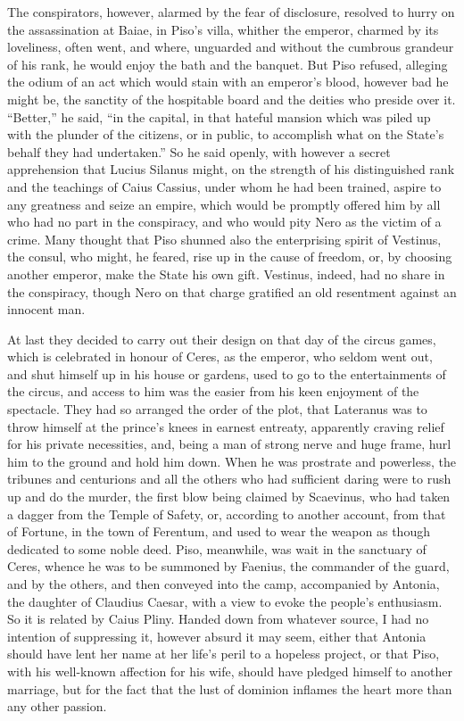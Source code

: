 The conspirators, however, alarmed by the fear of disclosure, resolved to hurry on the assassination at Baiae, in Piso's villa, whither the emperor, charmed by its loveliness, often went, and where, unguarded and without the cumbrous grandeur of his rank, he would enjoy the bath and the banquet. But Piso refused, alleging the odium of an act which would stain with an emperor's blood, however bad he might be, the sanctity of the hospitable board and the deities who preside over it. ``Better,'' he said, ``in the capital, in that hateful mansion which was piled up with the plunder of the citizens, or in public, to accomplish what on the State's behalf they had undertaken.'' So he said openly, with however a secret apprehension that Lucius Silanus might, on the strength of his distinguished rank and the teachings of Caius Cassius, under whom he had been trained, aspire to any greatness and seize an empire, which would be promptly offered him by all who had no part in the conspiracy, and who would pity Nero as the victim of a crime. Many thought that Piso shunned also the enterprising spirit of Vestinus, the consul, who might, he feared, rise up in the cause of freedom, or, by choosing another emperor, make the State his own gift. Vestinus, indeed, had no share in the conspiracy, though Nero on that charge gratified an old resentment against an innocent man.


At last they decided to carry out their design on that day of the circus games, which is celebrated in honour of Ceres, as the emperor, who seldom went out, and shut himself up in his house or gardens, used to go to the entertainments of the circus, and access to him was the easier from his keen enjoyment of the spectacle. They had so arranged the order of the plot, that Lateranus was to throw himself at the prince's knees in earnest entreaty, apparently craving relief for his private necessities, and, being a man of strong nerve and huge frame, hurl him to the ground and hold him down. When he was prostrate and powerless, the tribunes and centurions and all the others who had sufficient daring were to rush up and do the murder, the first blow being claimed by Scaevinus, who had taken a dagger from the Temple of Safety, or, according to another account, from that of Fortune, in the town of Ferentum, and used to wear the weapon as though dedicated to some noble deed. Piso, meanwhile, was wait in the sanctuary of Ceres, whence he was to be summoned by Faenius, the commander of the guard, and by the others, and then conveyed into the camp, accompanied by Antonia, the daughter of Claudius Caesar, with a view to evoke the people's enthusiasm. So it is related by Caius Pliny. Handed down from whatever source, I had no intention of suppressing it, however absurd it may seem, either that Antonia should have lent her name at her life's peril to a hopeless project, or that Piso, with his well-known affection for his wife, should have pledged himself to another marriage, but for the fact that the lust of dominion inflames the heart more than any other passion.

